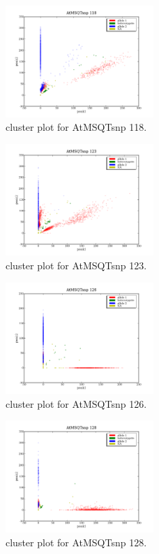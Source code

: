 \begin{figure}[H]
\includegraphics[width=0.5\textwidth]{figures/cluster_plot_AtMSQTsnp_118.png}
\caption{cluster plot for AtMSQTsnp 118.} \label{flAtMSQTsnp118}
\end{figure}

\begin{figure}[H]
\includegraphics[width=0.5\textwidth]{figures/cluster_plot_AtMSQTsnp_123.png}
\caption{cluster plot for AtMSQTsnp 123.} \label{flAtMSQTsnp123}
\end{figure}

\begin{figure}[H]
\includegraphics[width=0.5\textwidth]{figures/cluster_plot_AtMSQTsnp_126.png}
\caption{cluster plot for AtMSQTsnp 126.} \label{flAtMSQTsnp126}
\end{figure}

\begin{figure}[H]
\includegraphics[width=0.5\textwidth]{figures/cluster_plot_AtMSQTsnp_128.png}
\caption{cluster plot for AtMSQTsnp 128.} \label{flAtMSQTsnp128}
\end{figure}

